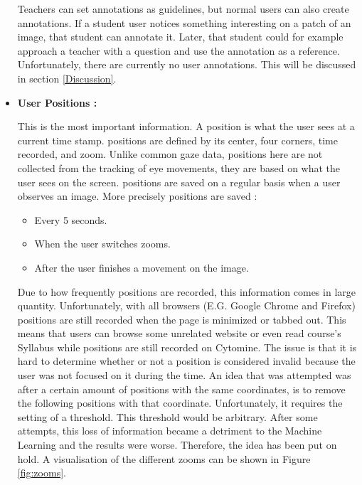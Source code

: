 \documentclass[a4paper,11pt]{report}
\numberwithin{figure}{section} %
\begin{document}
\begin{itemize}
        Teachers can set annotations as guidelines, but normal users can also create annotations.
        If a student user notices something interesting on a patch of an image, that student can annotate it.
        Later, that student could for example approach a teacher with a question and use the annotation as a reference.
        Unfortunately, there are currently no user annotations.
        This will be discussed in section \ref{Discussion}.\\

        \item[\textbullet]  \textbf{User Positions :}\newline

         This is the most important information.
         A position is what the user sees at a current time stamp.
         positions are defined by its center, four corners, time recorded, and zoom.
         Unlike common gaze data, positions here are not collected from the tracking of eye movements, they are based on what the user sees on the screen.
         positions are saved on a regular basis when a user observes an image.
         More precisely positions are saved :
         \begin{itemize}
         	\item[\textbullet] Every 5 seconds.
            \item[\textbullet] When the user switches zooms.
            \item[\textbullet] After the user finishes a movement on the image.
         \end{itemize}
         Due to how frequently positions are recorded, this information comes in large quantity.
         Unfortunately, with all browsers (E.G. Google Chrome and Firefox) positions are still recorded when the page is minimized or tabbed out.
         This means that users can browse some unrelated website or even read course's Syllabus while positions are still recorded on Cytomine.
         The issue is that it is hard to determine whether or not a position is considered invalid because the user was not focused on it during the time.
         An idea that was attempted was after a certain amount of positions with the same coordinates, is to remove the following positions with that coordinate.
         Unfortunately, it requires the setting of a threshold.
         This threshold would be arbitrary.
         After some attempts, this loss of information became a detriment to the Machine Learning and the results were worse.
         Therefore, the idea has been put on hold.
         A visualisation of the different zooms can be shown in Figure \ref{fig:zooms}.\\



\end{itemize}
\end{document}
